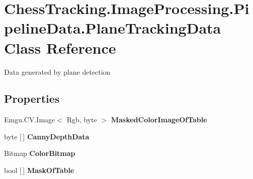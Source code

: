 \hypertarget{class_chess_tracking_1_1_image_processing_1_1_pipeline_data_1_1_plane_tracking_data}{}\section{Chess\+Tracking.\+Image\+Processing.\+Pipeline\+Data.\+Plane\+Tracking\+Data Class Reference}
\label{class_chess_tracking_1_1_image_processing_1_1_pipeline_data_1_1_plane_tracking_data}


Data generated by plane detection  


\subsection*{Properties}
\begin{DoxyCompactItemize}
\item 
\mbox{\label{class_chess_tracking_1_1_image_processing_1_1_pipeline_data_1_1_plane_tracking_data_a7a04cb0b39c4e147e4e575836019168c}} 
Emgu.\+C\+V.\+Image$<$ Rgb, byte $>$ {\bfseries Masked\+Color\+Image\+Of\+Table}
\item 
\mbox{\label{class_chess_tracking_1_1_image_processing_1_1_pipeline_data_1_1_plane_tracking_data_ad064056b29adf5b67831320f0f86e087}} 
byte \mbox{[}$\,$\mbox{]} {\bfseries Canny\+Depth\+Data}
\item 
\mbox{\label{class_chess_tracking_1_1_image_processing_1_1_pipeline_data_1_1_plane_tracking_data_ac140785c83560cc56de5bde2646eb8f5}} 
Bitmap {\bfseries Color\+Bitmap}
\item 
\mbox{\label{class_chess_tracking_1_1_image_processing_1_1_pipeline_data_1_1_plane_tracking_data_a096b5a6b2154f95cd1165e242e0ba8e4}} 
bool \mbox{[}$\,$\mbox{]} {\bfseries Mask\+Of\+Table}
\end{DoxyCompactItemize}


